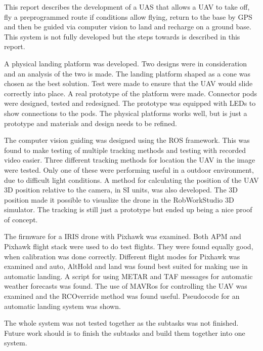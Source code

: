 This report describes the development of a UAS that allows a UAV to take off, fly a preprogrammed route if conditions allow flying, return to the base by GPS and then be guided via computer vision to land and recharge on a ground base. This system is not fully developed but the steps towards is described in this report. 

A physical landing platform was developed. Two designs were in consideration and an analysis of the two is made. The landing platform shaped as a cone was chosen as the best solution. Test were made to ensure that the UAV would slide correctly into place. A real prototype of the platform were made. Connector pods were designed, tested and redesigned. The prototype was equipped with LEDs to show connections to the pods. The physical platforms works well, but is just a prototype and materials and design needs to be refined. 

The computer vision guiding was designed using the ROS framework. This was found to make testing of multiple tracking methods and testing with recorded video easier. Three different tracking methods for location the UAV in the image were tested.  Only one of these were performing useful in a outdoor environment, due to difficult light conditions. A method for calculating the position of the UAV 3D position relative to the camera, in SI units, was also developed. The 3D position made it possible to visualize the drone in the RobWorkStudio 3D simulator. The tracking is still just a prototype but ended up being a nice proof of concept. 

The firmware for a IRIS drone with Pixhawk was examined. Both APM and Pixhawk flight stack were used to do test flights. They were found equally good, when calibration was done correctly. Different flight modes for Pixhawk was examined and auto, AltHold and land was found best suited for making use in automatic landing. A script for using METAR and TAF messages for automatic weather forecasts was found. The use of MAVRos for controlling the UAV was examined and the RCOverride method was found useful. Pseudocode for an automatic landing system was shown.

The whole system was not tested together as the subtasks was not finished. Future work should is to finish the subtasks and build them together into one system. 